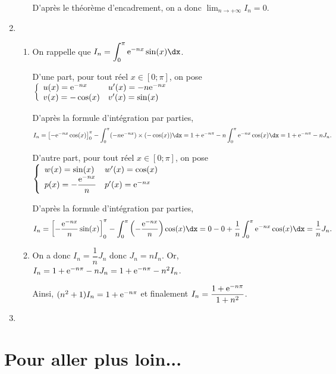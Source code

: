 \documentclass[11pt,fleqn, openany]{book} %
\begin{document}
\begin{solution}
\begin{enumerate}
\begin{enumerate}
D'après le théorème d'encadrement, on a donc $\displaystyle\lim_{n \to +\infty}I_n=0$.
\end{enumerate}
\vskip5pt
\item \begin{enumerate}

\item On rappelle que $I_n=\displaystyle\int_0^{\pi}\e^{-nx}\sin(x)\dx$.

D'une part, pour tout réel $x\in[0;\pi]$, on pose $\left\{\begin{array}{ll}u(x)=\mathrm{e}^{-nx} & u'(x)=-n\mathrm{e}^{-nx} \\ v(x)= -\cos(x) & v'(x)=\sin(x)\end{array}\right.$

D'après la formule d'intégration par parties,
\[I_n=\left[-\e^{-nx}\cos(x)\right]_0^{\pi}-\displaystyle\int_0^{\pi}(-n\e^{-nx}) \times (-\cos(x))\dx=1+\e^{-n\pi}-n\displaystyle\int_0^{\pi}\e^{-nx}\cos(x)\dx = 1+\e^{-n\pi}-nJ_n.\]

D'autre part, pour tout réel $x\in[0;\pi]$, on pose $\left\{\begin{array}{ll}w(x)=\sin(x) & w'(x)= \cos(x) \\ p(x)=-\dfrac{\mathrm{e}^{-nx}}{n} & p'(x)=\mathrm{e}^{-nx}\end{array}\right.$

D'après la formule d'intégration par parties,
\[I_n = \left[-\dfrac{\e^{-nx}}{n}\sin(x)\right]_0^{\pi}-\displaystyle\int_{0}^{\pi}\left(-\dfrac{\e^{-nx}}{n}\right)\cos(x)\dx=0-0+\dfrac{1}{n}\displaystyle\int_0^{\pi}\e^{-nx}\cos(x)\dx=\dfrac{1}{n}J_n.\]

\item On a donc $I_n=\dfrac{1}{n}J_n$ donc $J_n=nI_n$. Or, $I_n=1+\mathrm{e}^{-n\pi}-nJ_n=1+\mathrm{e}^{-n\pi}-n^2I_n$. 

Ainsi, $(n^2+1)I_n=1+\mathrm{e}^{-n\pi}$ et finalement $I_n=\dfrac{1+\mathrm{e}^{-n\pi}}{1+n^2}$.\end{enumerate}

\item 


\end{enumerate}

\end{solution}


\section*{Pour aller plus loin...}
\end{document}
